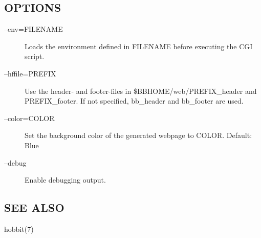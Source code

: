  
\subsection{OPTIONS}
\begin{description}
\item[--env=FILENAME] Loads the environment defined in FILENAME before executing the CGI script. 

 

\item[--hffile=PREFIX] Use the header- and footer-files in
  \$BBHOME/web/PREFIX\_header and PREFIX\_footer. If not specified,
  bb\_header and bb\_footer are used. 


 

\item[--color=COLOR] Set the background color of the generated webpage to COLOR. Default: Blue 

 

\item[--debug] Enable debugging output. 

 
\end{description}
\subsection{SEE ALSO}
hobbit(7) 

 






